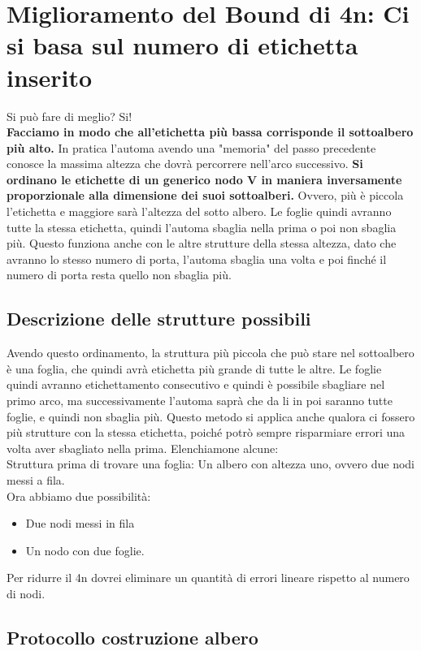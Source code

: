 \section{Miglioramento del Bound di 4n: Ci si basa sul numero di etichetta inserito}

Si può fare di meglio? Si!\\ \textbf{Facciamo in modo che all'etichetta più
    bassa corrisponde il sottoalbero più alto.} In pratica l'automa avendo una
"memoria" del passo precedente conosce la massima altezza che dovrà percorrere
nell'arco successivo. \textbf{Si ordinano le etichette di un generico nodo V in
    maniera inversamente proporzionale alla dimensione dei suoi sottoalberi.}
Ovvero, più è piccola l'etichetta e maggiore sarà l'altezza del sotto albero. Le
foglie quindi avranno tutte la stessa etichetta, quindi l'automa sbaglia nella
prima o poi non sbaglia più. Questo funziona anche con le altre strutture della
stessa altezza, dato che avranno lo stesso numero di porta, l'automa sbaglia una
volta e poi finché il numero di porta resta quello non sbaglia più.

\subsection{Descrizione delle strutture possibili}
Avendo questo ordinamento, la struttura più piccola che può stare nel
sottoalbero è una foglia, che quindi avrà etichetta più grande di tutte le
altre. Le foglie quindi avranno etichettamento consecutivo e quindi è possibile
sbagliare nel primo arco, ma successivamente l'automa saprà che da li in poi
saranno tutte foglie, e quindi non sbaglia più. Questo metodo si applica anche
qualora ci fossero più strutture con la stessa etichetta, poiché potrò sempre
risparmiare errori una volta aver sbagliato nella prima. Elenchiamone alcune:\\
Struttura prima di trovare una foglia: Un albero con altezza uno, ovvero due
nodi messi a fila.\\
Ora abbiamo due possibilità:
\begin{itemize}
    \item Due nodi messi in fila
    \item Un nodo con due foglie.
\end{itemize}
Per ridurre il 4n dovrei eliminare un quantità di errori lineare rispetto al
numero di nodi.
\subsection{Protocollo costruzione albero}

